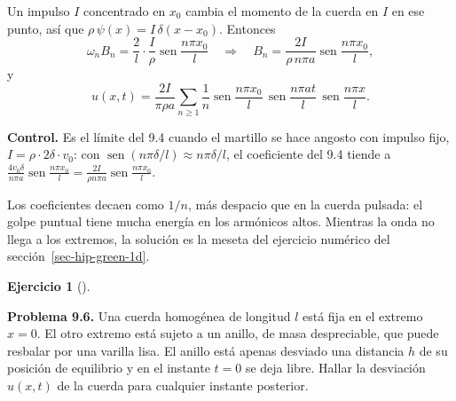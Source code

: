 \documentclass[
  spanish,
  a4paper,
]{scrbook}
\theoremstyle{definition}
\theoremstyle{plain}
\theoremstyle{definition}
\theoremstyle{plain}
\theoremstyle{definition}
\newtheorem{exercise}{Ejercicio}[chapter]
\theoremstyle{remark}
\begin{document}
\begin{tcolorbox}[enhanced jigsaw, arc=.35mm, bottomrule=.15mm, bottomtitle=1mm, breakable, colback=white, colbacktitle=quarto-callout-tip-color!10!white, colframe=quarto-callout-tip-color-frame, coltitle=black, left=2mm, leftrule=.75mm, opacityback=0, opacitybacktitle=0.6, rightrule=.15mm, title=\textcolor{quarto-callout-tip-color}{\faLightbulb}\hspace{0.5em}{Solución}, titlerule=0mm, toprule=.15mm, toptitle=1mm]

Un impulso \(I\) concentrado en \(x_0\) cambia el momento de la cuerda
en \(I\) en ese punto, así que \(\rho\,\psi(x) = I\,\delta(x-x_0)\).
Entonces \[
\omega_nB_n = \frac2l\cdot\frac{I}{\rho}\operatorname{sen}\frac{n\pi x_0}{l}
\quad\Longrightarrow\quad
B_n = \frac{2I}{\rho\,n\pi a}\operatorname{sen}\frac{n\pi x_0}{l},
\] y \[
u(x,t) = \frac{2I}{\pi\rho a}\sum_{n\ge1}\frac1n\operatorname{sen}\frac{n\pi x_0}{l}\,\operatorname{sen}\frac{n\pi at}{l}\,\operatorname{sen}\frac{n\pi x}{l}.
\]

\textbf{Control.} Es el límite del 9.4 cuando el martillo se hace
angosto con impulso fijo, \(I = \rho\cdot2\delta\cdot v_0\): con
\(\operatorname{sen}(n\pi\delta/l)\approx n\pi\delta/l\), el coeficiente
del 9.4 tiende a
\(\frac{4v_0\delta}{n\pi a}\operatorname{sen}\frac{n\pi x_0}{l} = \frac{2I}{\rho n\pi a}\operatorname{sen}\frac{n\pi x_0}{l}\).

Los coeficientes decaen como \(1/n\), más despacio que en la cuerda
pulsada: el golpe puntual tiene mucha energía en los armónicos altos.
Mientras la onda no llega a los extremos, la solución es la meseta del
ejercicio numérico del sección~\ref{sec-hip-green-1d}.

\end{tcolorbox}

\begin{exercise}[]\protect\hypertarget{exr-hip-p6}{}\label{exr-hip-p6}

\textbf{Problema 9.6.} Una cuerda homogénea de longitud \(l\) está fija
en el extremo \(x = 0\). El otro extremo está sujeto a un anillo, de
masa despreciable, que puede resbalar por una varilla lisa. El anillo
está apenas desviado una distancia \(h\) de su posición de equilibrio y
en el instante \(t = 0\) se deja libre. Hallar la desviación \(u(x,t)\)
de la cuerda para cualquier instante posterior.

\end{exercise}
\end{document}

